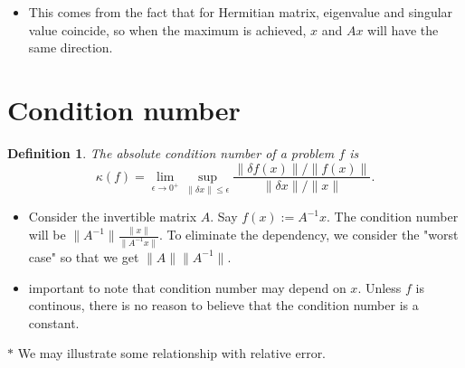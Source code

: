\documentclass[11pt,reqno]{amsart}
\newtheorem{definition}{Definition}
\theoremstyle{remark}
\newtheorem{fact}{Fact}
\begin{document}
\begin{itemize}
\begin{proof}
vectors and $C$ (k by n) consists of coefficient for each column vector of $A$.
 On the other hand, we can view each row of $A$ as linear 
 combination of row of $C$ with $B$ giving the coefficients. 
 This implies that $dim(rowsp(A))\leq dim(colsp(A))$. Apply the same
  principle to $A^T$ and we get the desired equality.
\end{proof}
\begin{fact}
$dim(AB)\leq \min (dim(A), dim(B))$
\end{fact}
\begin{fact}
For Hermitian $A$, we have $\max\lVert\langle Ax,x\rangle\rVert=\lVert A\rVert_2$.
\end{fact}
\item This comes from the fact that for Hermitian matrix, eigenvalue and singular value coincide, so when 
the maximum is achieved, $x$ and $Ax$ will have the same direction.
\end{itemize}

\section{Condition number}
\begin{definition}
The absolute condition number of a problem $f$ is
\[
\kappa(f) = \lim_{{\epsilon \to 0^+}} \sup_{{\lVert\delta x\rVert \leq \epsilon}} \frac{\lVert\delta f(x)\rVert / \lVert f(x)\rVert}{\lVert \delta x\rVert / \lVert x\rVert}.
\]
\end{definition}
\begin{itemize}
\item Consider the invertible matrix $A$. Say $f(x):=A^{-1}x$. The condition number will be $\lVert A^{-1}\rVert\frac{\lVert x\rVert}{\lVert A^{-1}x\rVert}$. To eliminate the dependency, we 
consider the "worst case" so that we get $\lVert A\rVert\lVert A^{-1}\rVert$.
\item important to note that condition number may depend on $x$. Unless $f$ is continous, there is no reason to believe that the condition number is a constant.
\end{itemize}
$\ast$ We may illustrate some relationship with relative error.
\end{document}
